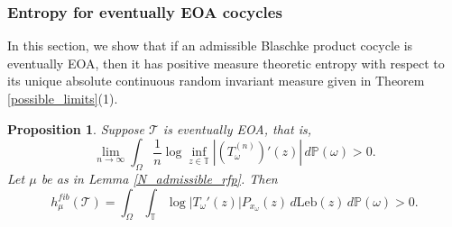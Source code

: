 \documentclass[12pt,reqno]{amsart}
\numberwithin{theorem}{section}
\newtheorem{proposition}[theorem]{Proposition}%
\begin{document}
\subsubsection{Entropy for eventually EOA cocycles}
In this section, we show that if an admissible Blaschke product cocycle is eventually EOA, then it has positive measure theoretic entropy with respect to its unique absolute continuous random invariant measure given in Theorem \ref{possible_limits}(1).

\begin{proposition}\label{EOA_positive_entropy}
    Suppose $\mathcal{T}$ is eventually EOA, that is, $$\lim_{n\to\infty}\int_{\Omega}\frac{1}{n}\log\inf_{z\in\mathbb{T}}|(T_{\omega}^{(n)})'(z)|\,d\mathbb{P}(\omega)>0.$$ Let $\mu$ be as in Lemma \ref{N_admissible_rfp}. Then $$h_{\mu}^{fib}(\mathcal{T})=\int_{\Omega}\int_{\mathbb{T}}\log|T_{\omega}'(z)|P_{x_{\omega}}(z)\,d\text{Leb}(z)\,d\mathbb{P}(\omega)>0.$$
\end{proposition}
\end{document}
